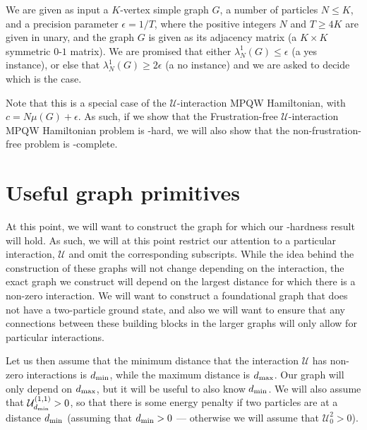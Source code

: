 \documentclass[../thesis-main/thesis-main]{subfiles}
\begin{document}
\begin{problem}
  We are given as input a $K$-vertex simple graph $G$, a number of particles $N\leq K$, and a precision parameter $\epsilon = 1/T$, where the positive integers $N$ and $T \geq 4K$ are given in unary, and the graph $G$ is given as its adjacency matrix (a $K\times K$ symmetric $0$-$1$ matrix). We are promised that either $\lambda_N^1(G) \leq \epsilon$ (a yes instance), or else that $\lambda_N^1(G) \geq 2\epsilon $ (a no instance) and we are asked to decide which is the case.
\end{problem}

Note that this is a special case of the $\mathcal{U}$-interaction MPQW Hamiltonian, with $c = N\mu(G) + \epsilon$.  As such, if we show that the Frustration-free $\mathcal{U}$-interaction MPQW Hamiltonian problem is \QMA-hard, we will also show that the non-frustration-free problem is \QMA-complete.

\section{Useful graph primitives}\label{sec:graph_primitives}

At this point, we will want to construct the graph for which our \QMA-hardness result will hold.  As such, we will at this point restrict our attention to a particular interaction, $\mathcal{U}$ and omit the corresponding subscripts.  While the idea behind the construction of these graphs will not change depending on the interaction, the exact graph we construct will depend on the largest distance for which there is a non-zero interaction.  We will want to construct a foundational graph that does not have a two-particle ground state, and also we will want to ensure that any connections between these building blocks in the larger graphs will only allow for particular interactions.

Let us then assume that the minimum distance that the interaction $\mathcal{U}$ has non-zero interactions is $d_{\text{min}}$, while the maximum distance is $d_{\text{max}}$.  Our graph will only depend on $d_{\text{max}}$, but it will be useful to also know $d_{\text{min}}$.  We will also assume that $\mathcal{U}_{d_{\text{min}}}^{(1,1)} > 0$, so that there is some energy penalty if two particles are at a distance $d_{\text{min}}$ (assuming that $d_{\text{min}} > 0$ --- otherwise we will assume that $\mathcal{U}_0^{2} > 0$).
\end{document}
